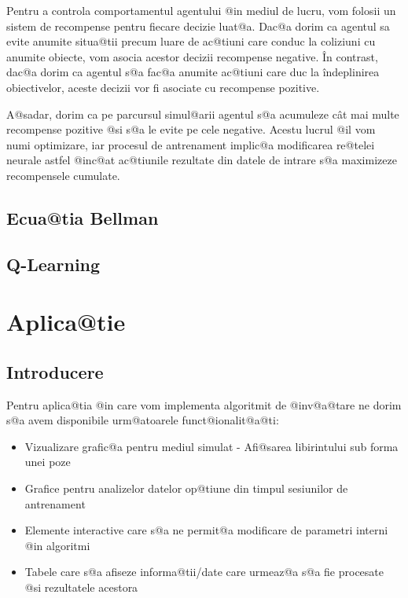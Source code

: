 Pentru a controla comportamentul agentului @in mediul de lucru, vom folosii un sistem de recompense pentru fiecare decizie luat@a. Dac@a dorim ca agentul sa evite anumite situa@tii precum luare de ac@tiuni care conduc la coliziuni cu anumite obiecte, vom asocia acestor decizii recompense negative. \^In contrast, dac@a dorim ca agentul s@a fac@a anumite ac@tiuni care duc la \^indeplinirea obiectivelor, aceste decizii vor fi asociate cu recompense pozitive.

A@sadar, dorim ca pe parcursul simul@arii agentul s@a acumuleze c\^ at mai multe recompense pozitive @si s@a le evite pe cele negative. Acestu lucrul @il vom numi optimizare, iar procesul de antrenament implic@a modificarea re@telei neurale astfel @inc@at ac@tiunile rezultate din datele de intrare s@a maximizeze recompensele cumulate.




\section{Ecua@tia Bellman}

\section{Q-Learning}

\chapter{Aplica@tie}

\section{Introducere}

Pentru aplica@tia @in care vom implementa algoritmit de @inv@a@tare ne dorim s@a avem disponibile urm@atoarele funct@ionalit@a@ti:

\begin{itemize}
	\item Vizualizare grafic@a pentru mediul simulat - Afi@sarea libirintului sub forma unei poze
	\item Grafice pentru analizelor datelor op@tiune din timpul sesiunilor de antrenament
	\item Elemente interactive care s@a ne permit@a modificare de parametri interni @in algoritmi
	\item Tabele care s@a afiseze informa@tii/date care urmeaz@a s@a fie procesate @si rezultatele acestora
\end{itemize}

